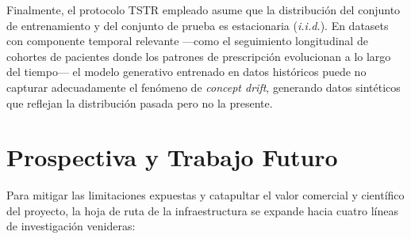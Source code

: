 Finalmente, el protocolo TSTR empleado asume que la distribución del conjunto de entrenamiento y del conjunto de prueba es estacionaria (\textit{i.i.d.}). En datasets con componente temporal relevante ---como el seguimiento longitudinal de cohortes de pacientes donde los patrones de prescripción evolucionan a lo largo del tiempo--- el modelo generativo entrenado en datos históricos puede no capturar adecuadamente el fenómeno de \textit{concept drift}, generando datos sintéticos que reflejan la distribución pasada pero no la presente.

\section{Prospectiva y Trabajo Futuro}

Para mitigar las limitaciones expuestas y catapultar el valor comercial y científico del proyecto, la hoja de ruta de la infraestructura se expande hacia cuatro líneas de investigación venideras:

